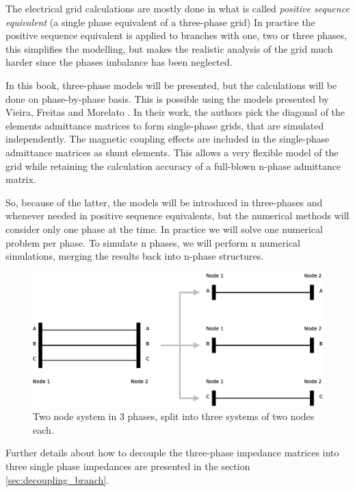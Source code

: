 \documentclass[nols,a4paper,twoside,notoc,fleqn]{tufte-book}
\begin{document}
The electrical grid calculations are mostly done in what is called \textit{positive sequence equivalent} (a single phase equivalent of a three-phase grid) In practice the positive sequence equivalent is applied to branches with one, two or three phases, this simplifies the modelling, but makes the realistic analysis of the grid much harder since the phases imbalance has been neglected.

In this book, three-phase models will be presented, but the calculations will be done on phase-by-phase basis. This is possible using the models presented by Vieira, Freitas and Morelato \cite{vieira2004phase}. In their work, the authors pick the diagonal of the elements admittance matrices to form single-phase grids, that are simulated independently. The magnetic coupling effects are included in the single-phase admittance matrices as shunt elements. This allows a very flexible model of the grid while retaining the calculation accuracy of a full-blown n-phase admittance matrix.

So, because of the latter, the models will be introduced in three-phases and whenever needed in positive sequence equivalents, but the numerical methods will consider only one phase at the time. In practice we will solve one numerical problem per phase. To simulate n phases, we will perform n numerical simulations, merging the results back into n-phase structures.

\begin{figure}
  \includegraphics[width=\linewidth]{img/3p_to_1p.eps}
  \caption{Two node system in 3 phases, split into three systems of two nodes each.}
  \label{fig:3p_to_1p}
\end{figure}

Further details about how to decouple the three-phase impedance matrices into three single phase impedances are presented in the section \ref{sec:decoupling_branch}.

\end{document}
